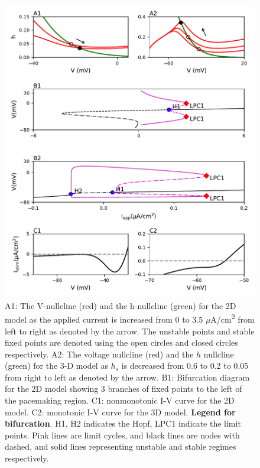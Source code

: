 \begin{figure}
	\centering
	\includegraphics[scale=0.7]{../figures/figure_4.pdf}
	\caption{A1: The V-nullcline (red) and the h-nullcline (green) for the 2D model as the applied current is increased from 0 to 3.5 $\mu$A/cm\textsuperscript{2} from left to right as denoted by the arrow. The unstable points and stable fixed points are denoted using the open circles and closed circles respectively. A2: The voltage nullcline (red) and the $h$ nullcline (green) for the 3-D model as $h_s$ is decreased from 0.6 to 0.2 to 0.05 from right to left as denoted by the arrow. B1: Bifurcation diagram for the 2D model showing 3 branches of fixed points to the left of the pacemaking region. C1: nonmonotonic I-V curve for the 2D model. C2: monotonic I-V curve for the 3D model. \textbf{Legend for bifurcation}. H1, H2 indicates the Hopf, LPC1 indicate the limit points. Pink lines are limit cycles, and black lines are nodes with dashed, and solid lines representing unstable and stable regimes respectively.}
	\label{fig:4}
\end{figure}


